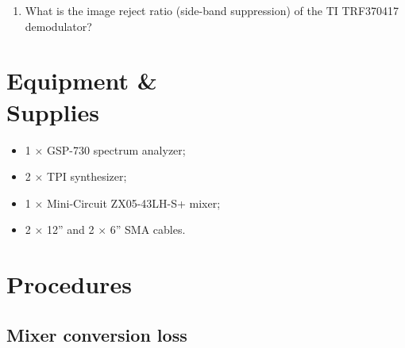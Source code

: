\documentclass[letterpaper, 11pt]{article}
\begin{document}
\begin{enumerate}
	\item What is the image reject ratio (side-band suppression) of the TI TRF370417 demodulator?
	
\end{enumerate}

\section{Equipment \& \\Supplies}

\begin{itemize}[itemsep=0.5ex]
	\item 1 $\times$ GSP-730 spectrum analyzer;
	\item 2 $\times$ TPI synthesizer;
	\item 1 $\times$ Mini-Circuit ZX05-43LH-S+ mixer;
	\item 2 $\times$ 12'' and 2 $\times$ 6'' SMA cables.
\end{itemize}

\section{Procedures}

\subsection{Mixer conversion loss}
\label{sec:mixer_cl}
\end{document}
